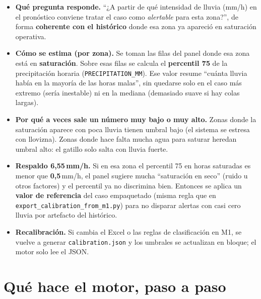 \documentclass[11pt,a4paper]{article}
\begin{document}
\begin{itemize}
  \item \textbf{Qué pregunta responde.} ``¿A partir de qué intensidad de lluvia (mm/h) en el pronóstico conviene tratar el caso como \emph{alertable} para esta zona?'', de forma \textbf{coherente con el histórico} donde esa zona ya apareció en saturación operativa.
  \item \textbf{Cómo se estima (por zona).} Se toman las filas del panel donde esa zona está en \textbf{saturación}. Sobre esas filas se calcula el \textbf{percentil 75} de la precipitación horaria (\texttt{PRECIPITATION\_MM}). Ese valor resume ``cuánta lluvia había en la mayoría de las horas malas'', sin quedarse solo en el caso más extremo (sería inestable) ni en la mediana (demasiado suave si hay colas largas).
  \item \textbf{Por qué a veces sale un número muy bajo o muy alto.} Zonas donde la saturación aparece con poca lluvia tienen umbral bajo (el sistema se estresa con llovizna). Zonas donde hace falta mucha agua para saturar heredan umbral alto: el gatillo solo salta con lluvia fuerte.
  \item \textbf{Respaldo 6{,}55\,mm/h.} Si en esa zona el percentil 75 en horas saturadas es menor que \textbf{0{,}5}\,mm/h, el panel sugiere mucha ``saturación en seco'' (ruido u otros factores) y el percentil ya no discrimina bien. Entonces se aplica un \textbf{valor de referencia} del caso empaquetado (misma regla que en \texttt{export\_calibration\_from\_m1.py}) para no disparar alertas con casi cero lluvia por artefacto del histórico.
  \item \textbf{Recalibración.} Si cambia el Excel o las reglas de clasificación en M1, se vuelve a generar \texttt{calibration.json} y los umbrales se actualizan en bloque; el motor solo lee el JSON.
\end{itemize}

\section*{Qué hace el motor, paso a paso}
\end{document}
